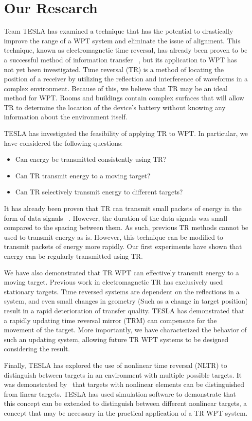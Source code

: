 \section{Our Research}
Team TESLA has examined a technique that has the potential to drastically improve the range of a WPT system and eliminate the issue of alignment. This technique, known as electromagnetic time reversal, has already been proven to be a successful method of information transfer ~\cite{nltr-wave-chaotic,cepni2005experimental}, but its application to WPT has not yet been investigated. Time reversal (TR) is a method of locating the position of a receiver by utilizing the reflection and interference of waveforms in a complex environment. Because of this, we believe that TR may be an ideal method for WPT. Rooms and buildings contain complex surfaces that will allow TR to determine the location of the device's battery without knowing any information about the environment itself.

TESLA has investigated the feasibility of applying TR to WPT. In particular, we have considered the following questions:
\begin{itemize}
\item Can energy be transmitted consistently using TR?
\item Can TR transmit energy to a moving target?
\item Can TR selectively transmit energy to different targets?
\end{itemize}

It has already been proven that TR can transmit small packets of energy in the form of data signals ~\cite{nltr-wave-chaotic}. However, the duration of the data signals was small compared to the spacing between them. As such, previous TR methods cannot be used to transmit energy as is.  However, this technique can be modified to transmit packets of energy more rapidly. Our first experiments have shown that energy can be regularly transmitted using TR.

We have also demonstrated that TR WPT can effectively transmit energy to a moving target. Previous work in electromagnetic TR has exclusively used stationary targets. Time reversed systems are dependent on the reflections in a system, and even small changes in geometry (Such as a change in target position) result in a rapid deterioration of transfer quality.  TESLA has demonstrated that a rapidly updating time reversal mirror (TRM) can compensate for the movement of the target.  More importantly, we have characterized the behavior of such an updating system, allowing future TR WPT systems to be designed considering the result.

Finally, TESLA has explored the use of nonlinear time reversal (NLTR) to distinguish between targets in an environment with multiple possible targets. It was demonstrated by~\cite{nltr-wave-chaotic} that targets with nonlinear elements can be distinguished from linear targets.  TESLA has used simulation software to demonstrate that this concept can be extended to distinguish between different nonlinear targets, a concept that may be necessary in the practical application of a TR WPT system.
